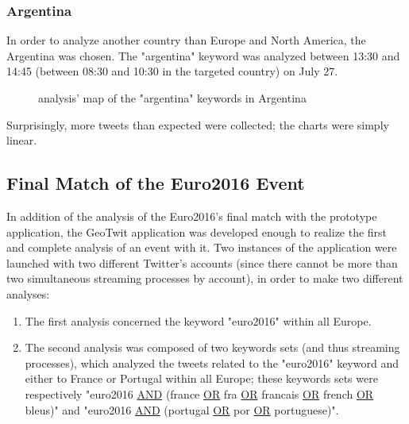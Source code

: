 \documentclass[a4paper,11pt]{report}
\begin{document}
\subsubsection{Argentina}
In order to analyze another country than Europe and North America, the Argentina was chosen. The "argentina" keyword was analyzed between 13:30 and 14:45 (between 08:30 and 10:30 in the targeted country) on July 27.
\begin{figure}[H]
\vspace{-5pt}
\begin{center}
\vspace{-20pt}
\caption{analysis' map of the "argentina" keywords in Argentina}
\end{center}
\end{figure}
\vspace{-10pt}
Surprisingly, more tweets than expected were collected; the charts were simply linear.

\subsection{Final Match of the Euro2016 Event}
\label{euro2016final}
In addition of the analysis of the Euro2016's final match with the prototype application, the GeoTwit application was developed enough to realize the first and complete analysis of an event with it. Two instances of the application were launched with two different Twitter's accounts (since there cannot be more than two simultaneous streaming processes by account), in order to make two different analyses:
\begin{enumerate}
	\item The first analysis concerned the keyword "euro2016" within all Europe.
	\item The second analysis was composed of two keywords sets (and thus streaming processes), which analyzed the tweets related to the "euro2016" keyword and either to France or Portugal within all Europe; these keywords sets were respectively "euro2016 \underline{AND} (france \underline{OR} fra \underline{OR} francais \underline{OR} french \underline{OR} bleus)" and "euro2016 \underline{AND} (portugal \underline{OR} por \underline{OR} portuguese)".
\end{enumerate}
\end{document}
